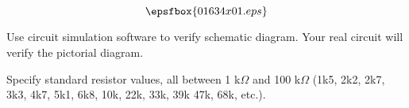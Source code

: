 

$$\epsfbox{01634x01.eps}$$

\vfil \eject






Use circuit simulation software to verify schematic diagram.  Your real circuit will verify the pictorial diagram.







Specify standard resistor values, all between 1 k$\Omega$ and 100 k$\Omega$ (1k5, 2k2, 2k7, 3k3, 4k7, 5k1, 6k8, 10k, 22k, 33k, 39k 47k, 68k, etc.).




